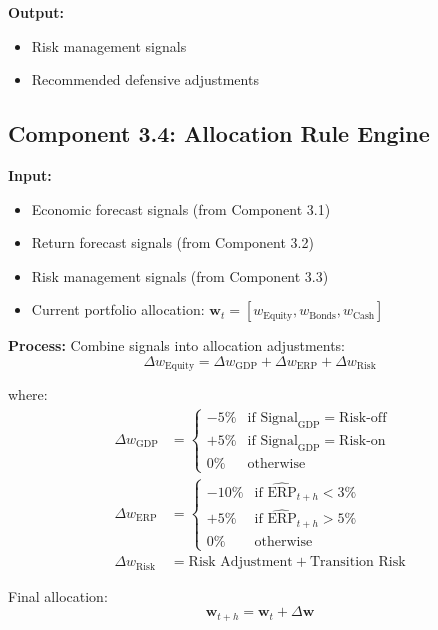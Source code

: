 \documentclass[11pt,a4paper]{article}
\begin{document}
\textbf{Output:}
\begin{itemize}
    \item Risk management signals
    \item Recommended defensive adjustments
\end{itemize}

\subsection{Component 3.4: Allocation Rule Engine}

\textbf{Input:}
\begin{itemize}
    \item Economic forecast signals (from Component 3.1)
    \item Return forecast signals (from Component 3.2)
    \item Risk management signals (from Component 3.3)
    \item Current portfolio allocation: $\mathbf{w}_t = [w_{\text{Equity}}, w_{\text{Bonds}}, w_{\text{Cash}}]$
\end{itemize}

\textbf{Process:}
Combine signals into allocation adjustments:
\begin{equation}
    \Delta w_{\text{Equity}} = \Delta w_{\text{GDP}} + \Delta w_{\text{ERP}} + \Delta w_{\text{Risk}}
\end{equation}

where:
\begin{align}
    \Delta w_{\text{GDP}} &= \begin{cases}
        -5\% & \text{if } \text{Signal}_{\text{GDP}} = \text{Risk-off} \\
        +5\% & \text{if } \text{Signal}_{\text{GDP}} = \text{Risk-on} \\
        0\% & \text{otherwise}
    \end{cases} \\
    \Delta w_{\text{ERP}} &= \begin{cases}
        -10\% & \text{if } \widehat{\text{ERP}}_{t+h} < 3\% \\
        +5\% & \text{if } \widehat{\text{ERP}}_{t+h} > 5\% \\
        0\% & \text{otherwise}
    \end{cases} \\
    \Delta w_{\text{Risk}} &= \text{Risk Adjustment} + \text{Transition Risk}
\end{align}

Final allocation:
\begin{equation}
    \mathbf{w}_{t+h} = \mathbf{w}_t + \Delta \mathbf{w}
\end{equation}
\end{document}
